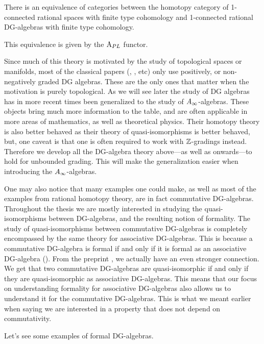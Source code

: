 \begin{theorem}
There is an equivalence of categories between the homotopy category of 1-connected rational spaces with finite type cohomology and 1-connected rational DG-algebras with finite type cohomology. 

This equivalence is given by the $\text{A}_{PL}$ functor. 
\end{theorem}

\begin{remark}
Since much of this theory is motivated by the study of topological spaces or manifolds, most of the classical papers (\cite{DGMS}, \cite{Sullivan}, \cite{PLdeRham} etc) only use positively, or non-negatively graded DG algebras. These are the only ones that matter when the motivation is purely topological. As we will see later the study of DG algebras has in more recent times been generalized to the study of $A_{\infty}$-algebras. These objects bring much more information to the table, and are often applicable in more areas of mathematics, as well as theoretical physics. Their homotopy theory is also better behaved as their theory of quasi-isomorphisms is better behaved, but, one caveat is that one is often required to work with $\mathbb{Z}$-gradings instead. Therefore we develop all the DG-algebra theory above---as well as onwards---to hold for unbounded grading. This will make the generalization easier when introducing the $A_{\infty}$-algebras. 
\end{remark}

One may also notice that many examples one could make, as well as most of the examples from rational homotopy theory, are in fact commutative DG-algebras. Throughout the thesis we are mostly interested in studying the quasi-isomorphisms between DG-algebras, and the resulting notion of formality. The study of quasi-isomorphisms between commutative DG-algebras is completely encompassed by the same theory for associative DG-algebras. This is because a commutative DG-algebra is formal if and only if it is formal as an associative DG-algebra (\cite{Saleh}). From the preprint \cite{Petersen}, we actually have an even stronger connection. We get that two commutative DG-algebras are quasi-isomorphic if and only if they are quasi-isomorphic as associative DG-algebras. This means that our focus on understanding formality for associative DG-algebras also allows us to understand it for the commutative DG-algebras. This is what we meant earlier when saying we are interested in a property that does not depend on commutativity. 

Let's see some examples of formal DG-algebras. 

